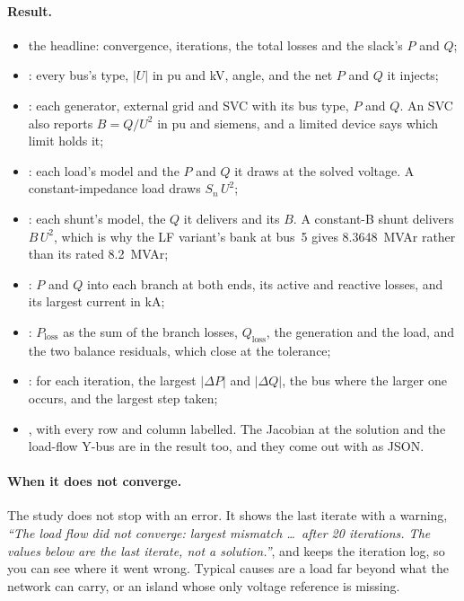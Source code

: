 \paragraph{Result.}
\begin{itemize}
  \item the headline: convergence, iterations, the total losses and the slack's $P$ and
    $Q$;
  \item {}: every bus's type, $|U|$ in pu and kV, angle, and the
    net $P$ and $Q$ it injects;
  \item {}: each generator, external grid and SVC with
    its bus type, $P$ and $Q$. An SVC also reports $B = Q/U^2$ in pu and siemens, and a
    limited device says which limit holds it;
  \item {}: each load's model and the $P$ and $Q$ it draws at the solved voltage.
    A constant-impedance load draws $S_n\,U^2$;
  \item {}: each shunt's model, the $Q$ it delivers and its $B$. A constant-B
    shunt delivers $B\,U^2$, which is why the LF variant's bank at bus~5 gives 8.3648~MVAr
    rather than its rated 8.2~MVAr;
  \item {}: $P$ and $Q$ into each branch at both ends, its active and
    reactive losses, and its largest current in kA;
  \item {}: $P_\text{loss}$ as the sum of the branch losses,
    $Q_\text{loss}$, the generation and the load, and the two balance residuals, which
    close at the tolerance;
  \item {}: for each iteration, the largest $|\Delta P|$ and
    $|\Delta Q|$, the bus where the larger one occurs, and the largest step taken;
  \item {}, with every row and column labelled.
    The Jacobian at the solution and the load-flow Y-bus are in the result too, and they
    come out with  as JSON.
\end{itemize}

\paragraph{When it does not converge.} The study does not stop with an error. It shows
the last iterate with a warning, \emph{``The load flow did not converge: largest mismatch
\dots\ after 20 iterations. The values below are the last iterate, not a solution.''},
and keeps the iteration log, so you can see where it went wrong. Typical causes are a load
far beyond what the network can carry, or an island whose only voltage reference is
missing.


